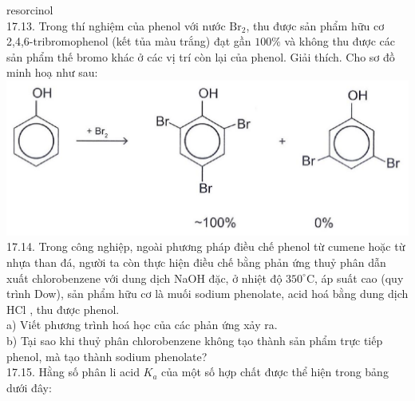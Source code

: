 \documentclass[10pt]{article}
\begin{document}
resorcinol\\
17.13. Trong thí nghiệm của phenol với nước $\mathrm{Br}_{2}$, thu được sản phẩm hữu cơ 2,4,6-tribromophenol (kết tủa màu trắng) đạt gần $100 \%$ và không thu được các sản phẩm thế bromo khác ở các vị trí còn lại của phenol. Giải thích. Cho sơ đồ minh hoạ như sau:\\
\includegraphics[max width=\textwidth, center]{2025_10_23_ae7aef68fb3b41082d29g-40}\\
17.14. Trong công nghiệp, ngoài phương pháp điều chế phenol từ cumene hoặc từ nhựa than đá, người ta còn thực hiện điều chế bằng phản ứng thuỷ phân dẫn xuất chlorobenzene với dung dịch NaOH đặc, ở nhiệt độ $350^{\circ} \mathrm{C}$, áp suất cao (quy trình Dow), sản phẩm hữu cơ là muối sodium phenolate, acid hoá bằng dung dịch HCl , thu được phenol.\\
a) Viết phương trình hoá học của các phản ứng xảy ra.\\
b) Tại sao khi thuỷ phân chlorobenzene không tạo thành sản phẩm trực tiếp phenol, mà tạo thành sodium phenolate?\\
17.15. Hằng số phân li acid $K_{a}$ của một số hợp chất được thể hiện trong bảng dưới đây:
\end{document}
